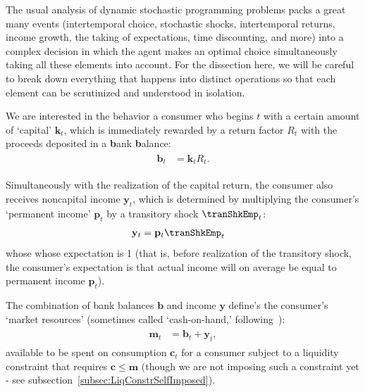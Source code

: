 \documentclass[titlepage, headings=optiontotocandhead]{econtex}
\begin{document}
The usual analysis of dynamic stochastic programming problems packs a great many events (intertemporal choice, stochastic shocks, intertemporal returns, income growth, the taking of expectations, time discounting, and more) into a complex decision in which the agent makes an optimal choice simultaneously taking all these elements into account. For the dissection here, we will be careful to break down everything that happens into distinct operations so that each element can be scrutinized and understood in isolation.

We are interested in the behavior a consumer who begins {\interval} $t$ with a certain amount of `capital' $\mathbf{k}_{t}$, which is immediately rewarded by a return factor $R_{t}$  with the proceeds deposited in a \textbf{b}ank \textbf{b}alance:
\begin{equation}\begin{gathered}\begin{aligned}\label{eq:bLvl}
      \mathbf{b}_{t} & = \mathbf{k}_{t}R_{t}. 
    \end{aligned}\end{gathered}\end{equation}

Simultaneously with the realization of the capital return, the consumer also receives noncapital income $\mathbf{y}_{t}$, which is determined by multiplying the consumer's `permanent income' $\mathbf{p}_{t}$ by a transitory shock $\tranShkEmp_{t}$:
\begin{equation}\begin{gathered}\begin{aligned}
      \mathbf{y}_{t} & = \mathbf{p}_{t}\tranShkEmp_{t} \label{eq:yLvl}
    \end{aligned}\end{gathered}\end{equation}
whose whose expectation is 1 (that is, before realization of the transitory shock, the consumer's expectation is that actual income will on average be equal to permanent income $\mathbf{p}_{t}$).

The combination of bank balances $\mathbf{b}$ and income $\mathbf{y}$ define's the consumer's `market resources' (sometimes called `cash-on-hand,' following~\cite{deatonUnderstandingC}):
\begin{equation}\begin{gathered}\begin{aligned}
      \mathbf{m}_{t} & = \mathbf{b}_{t}+\mathbf{y}_{t} \label{eq:mLvl},
    \end{aligned}\end{gathered}\end{equation}
available to be spent on consumption $\mathbf{c}_{t}$ for a consumer subject to a liquidity constraint that requires $\mathbf{c} \leq \mathbf{m}$ (though we are not imposing such a constraint yet - see subsection~\ref{subsec:LiqConstrSelfImposed}).
\end{document}
